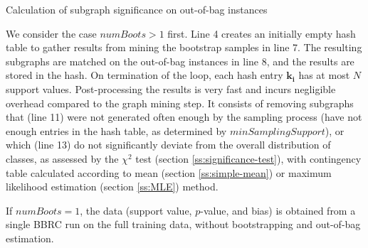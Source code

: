\documentclass{sig-alternate}
\begin{document}
\begin{algorithm2e*}[t]
  \caption{Calculation of subgraph significance on out-of-bag instances\label{alg:bbrc-sample}}
\end{algorithm2e*}
 We consider the case $numBoots>1$ first.  Line 4
creates an initially empty hash table to gather results from mining the bootstrap samples in
line 7. The resulting subgraphs are matched on the out-of-bag instances in line
8, and the results are stored in the hash. On termination of the loop, each hash
entry $\mathbf{k_i}$ has at most $N$ support values. Post-processing the results is
very fast and incurs negligible overhead compared to the graph mining step. It
consists of removing subgraphs that (line 11) were not generated often enough
by the sampling process (have not enough entries in the hash table, as
determined by $minSamplingSupport$), or which (line 13) do not significantly
deviate from the overall distribution of classes, as assessed by the $\chi^2$
test (section \ref{ss:significance-test}), with contingency table calculated
according to mean (section \ref{ss:simple-mean}) or maximum likelihood
estimation (section \ref{ss:MLE}) method. 

If $numBoots=1$, the data (support value, $p$-value, and bias) is obtained from a single BBRC run on the full training data, without bootstrapping and out-of-bag estimation.
\end{document}
